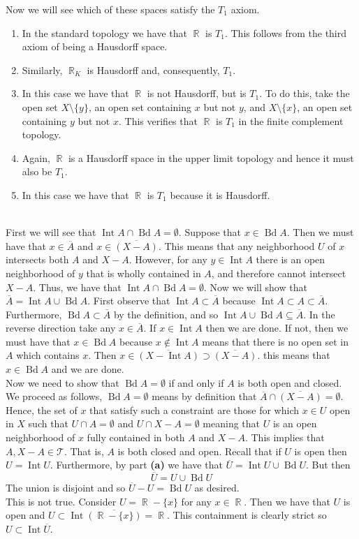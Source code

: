 \documentclass{article}
\DeclareMathOperator{\R}{\mathbb{R}}
\DeclareMathOperator{\interior}{\text{Int}}
\DeclareMathOperator{\bd}{\text{Bd}}
\newcommand{\problem}[1]{\noindent{\textbf{Problem #1}}\\}
\newcommand{\problempart}[1]{\noindent{\textbf{(#1)}}}
\begin{document}
Now we will see which of these spaces satisfy the $T_1$ axiom.
\begin{enumerate}
\item In the standard topology we have that $\R$ is $T_1$. This follows from the third axiom of being a Hausdorff space.
\item Similarly, $\R_K$ is Hausdorff and, consequently, $T_1$.
\item In this case we have that $\R$ is not Hausdorff, but is $T_1$. To do this, take the open set $X\setminus\{y\}$, an open set containing $x$ but not $y$, and $X\setminus\{x\}$, an open set containing $y$ but not $x$. This verifies that $\R$ is $T_1$ in the finite complement topology. 
\item Again, $\R$ is a Hausdorff space in the upper limit topology and hence it must also be $T_1$.
\item In this case we have that $\R$ is $T_1$ because it is Hausdorff. 
\end{enumerate}

\problem{17.19}
\problempart{a} First we will see that $\interior A \cap \bd A = \emptyset$. Suppose that $x \in \bd A$. Then we must have that $x \in \overline{A}$ and $x \in \overline{(X - A)}$. This means that any neighborhood $U$ of $x$ intersects both $A$ and $X-A$. However, for any $y \in \interior A$ there is an open neighborhood of $y$ that is wholly contained in $A$, and therefore cannot intersect $X-A$. Thus, we have that $\interior A \cap \bd A = \emptyset$. Now we will show that $\overline{A} = \interior A \cup \bd A$. First observe that $\interior A \subset \overline{A}$ because $\interior A \subset A \subset \overline{A}$. Furthermore, $\bd A \subset \overline{A}$ by the definition, and so $\interior A \cup \bd A \subseteq \overline{A}$. In the reverse direction take any $x \in \overline{A}$. If $x \in \interior A$ then we are done. If not, then we must have that $x \in \bd A$ because $x \not\in \interior A$ means that there is no open set in $A$ which contains $x$. Then $x \in \overline{(X-\interior A)} \supset \overline{(X-A)}$. this means that $x \in \bd A$ and we are done.  \\
\problempart{b} Now we need to show that $\bd A = \emptyset$ if and only if $A$ is both open and closed.   We proceed as follows, $\bd A = \emptyset$ means by definition that $\overline{A} \cap \overline{(X-A)} = \emptyset$. Hence, the set of $x$ that satisfy such a constraint are those for which $x \in U$ open in $X$ such that $U\cap A = \emptyset$ and $U\cap X-A = \emptyset$ meaning that $U$ is an open neighborhood of $x$ fully contained in both $A$ and $X-A$. This implies that $A, X-A \in \mathcal{T}$. That is, $A$ is both closed and open. 
\problempart{c} Recall that if $U$ is open then $U = \interior U$. Furthermore, by part {\bf (a)} we have that $\overline{U} = \interior U \cup \bd U$. But then 
\[
\overline{U} = U \cup \bd U
\]
The union is disjoint and so $\overline{U} - U = \bd U$ as desired. \\
\problempart{d} This is not true. Consider $U = \R - \{x\}$ for any $x \in \R$. Then we have that $U$ is open and $ U \subset \interior\overline{(\R - \{x\})} = \R$. This containment is clearly strict so $U \subset \interior \overline{U}$. 
\end{document}
